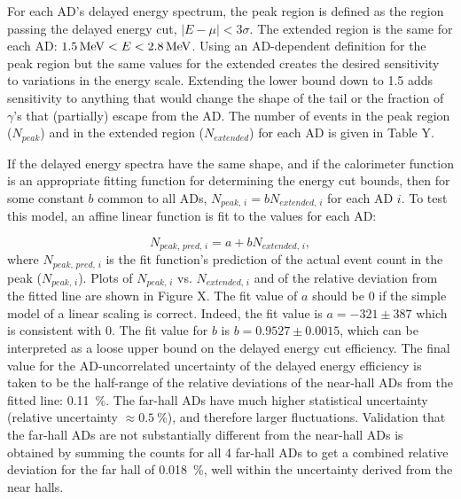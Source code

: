 For each AD's delayed energy spectrum, the peak region is defined as
the region passing the delayed energy cut, $\vert E-\mu \vert < 3\sigma$.
The extended region is the same for each AD:
$\SI{1.5}{\mega\electronvolt} < E < \SI{2.8}{\mega\electronvolt}$.
Using an AD-dependent definition for the peak region but
the same values for the extended creates
the desired sensitivity to variations in the energy scale.
Extending the lower bound down to \SI{1.5}{\mev} adds sensitivity to
anything that would change the shape of the tail
or the fraction of $\gamma$'s that (partially) escape from the AD.
The number of events in the peak region ($N_{peak}$)
and in the extended region ($N_{extended}$) for each AD
is given in Table Y. %

If the delayed energy spectra have the same shape,
and if the calorimeter function is an appropriate fitting function
for determining the energy cut bounds,
then for some constant $b$ common to all ADs,
$N_{peak,\,i} = b N_{extended,\,i}$ for each AD $i$.
To test this model, an affine linear function is fit
to the values for each AD:

\begin{equation}
    N_{peak,\,pred,\,i} = a + b N_{extended,\,i},
\end{equation}
where $N_{peak,\,pred,\,i}$ is the fit function's prediction
of the actual event count in the peak ($N_{peak,\,i}$).
Plots of $N_{peak,\,i}$ vs. $N_{extended,\,i}$ and of the
relative deviation from the fitted line are shown in Figure X. %
The fit value of $a$ should be $0$ if the simple model of
a linear scaling is correct.
Indeed, the fit value is $a = -321 \pm 387$
which is consistent with $0$.
The fit value for $b$ is $b = 0.9527 \pm 0.0015$,
which can be interpreted as a loose upper bound
on the delayed energy cut efficiency.
The final value for the AD-uncorrelated uncertainty
of the delayed energy efficiency is taken to be
the half-range of the relative deviations
of the near-hall ADs from the fitted line: \SI{0.11}{\percent}.
The far-hall ADs have much higher statistical uncertainty
(relative uncertainty $\approx\SI{0.5}{\percent}$),
and therefore larger fluctuations.
Validation that the far-hall ADs are not
substantially different from the near-hall ADs is obtained by
summing the counts for all 4 far-hall ADs to get
a combined relative deviation for the far hall of \SI{0.018}{\percent},
well within the uncertainty derived from the near halls.


